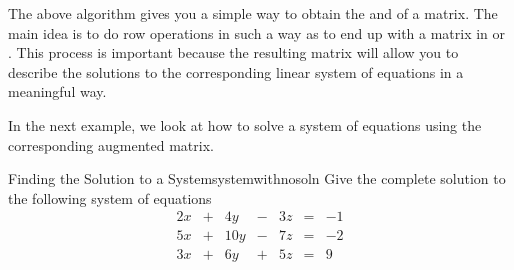 


The above algorithm gives you a simple way to obtain the \ef \;and \rref \;of a matrix.
The main idea is to do row operations in such a way as to end up with a
matrix in \ef \;or \rref. This process is important because the resulting matrix will 
allow you to describe the
solutions to the corresponding linear system of equations in a meaningful way. 

In the next example, we look at how to solve a system of equations using the corresponding augmented matrix.

\begin{example}{Finding the Solution to a System}{systemwithnosoln}
Give the complete solution to the following system of equations \:
\begin{equation*}
\begin{array}{ccccccccc}
2x&+&4y&-&3z&=&-1\\
5x&+&10y&-&7z&=&-2\\
3x&+&6y&+&5z&=&9
\end{array}
\end{equation*}
\end{example}

